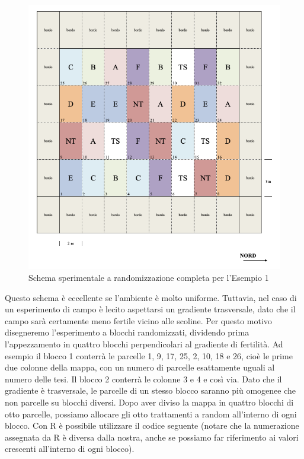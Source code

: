 \documentclass[a4paper,12pt,oneside]{book}
\theoremstyle{definition}
\theoremstyle{definition}
\theoremstyle{definition}
\theoremstyle{remark}
\begin{document}
\begin{figure}

{\centering \includegraphics[width=0.9\linewidth]{_images/Mappa1CRD} 

}

\caption{Schema sperimentale a randomizzazione completa per l'Esempio 1}\label{fig:figName33}
\end{figure}

Questo schema è eccellente se l'ambiente è molto uniforme. Tuttavia, nel
caso di un esperimento di campo è lecito aspettarsi un gradiente
trasversale, dato che il campo sarà certamente meno fertile vicino alle
scoline. Per questo motivo disegneremo l'esperimento a blocchi
randomizzati, dividendo prima l'appezzamento in quattro blocchi
perpendicolari al gradiente di fertilità. Ad esempio il blocco 1
conterrà le parcelle 1, 9, 17, 25, 2, 10, 18 e 26, cioè le prime due
colonne della mappa, con un numero di parcelle esattamente uguali al
numero delle tesi. Il blocco 2 conterrà le colonne 3 e 4 e così via.
Dato che il gradiente è trasversale, le parcelle di un stesso blocco
saranno più omogenee che non parcelle su blocchi diversi. Dopo aver
diviso la mappa in quattro blocchi di otto parcelle, possiamo allocare
gli otto trattamenti a random all'interno di ogni blocco. Con R è
possibile utilizzare il codice seguente (notare che la numerazione
assegnata da R è diversa dalla nostra, anche se possiamo far riferimento
ai valori crescenti all'interno di ogni blocco).
\end{document}
